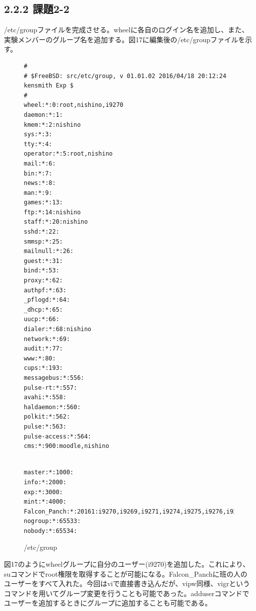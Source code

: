 \documentclass[12pt]{jreport}
\begin{document}
            \subsection*{2.2.2 課題2-2}
                /etc/groupファイルを完成させる。wheelに各自のログイン名を追加し、また、実験メンバーのグループ名を追加する。図17に編集後の/etc/groupファイルを示す。
                \begin{figure}[H]
                    \begin{center}
                        \begin{screen}
                            \begin{verbatim}
#
# $FreeBSD: src/etc/group, v 01.01.02 2016/04/18 20:12:24 kensmith Exp $
#
wheel:*:0:root,nishino,i9270
daemon:*:1:
kmem:*:2:nishino
sys:*:3:
tty:*:4:
operator:*:5:root,nishino
mail:*:6:
bin:*:7:
news:*:8:
man:*:9:
games:*:13:
ftp:*:14:nishino
staff:*:20:nishino
sshd:*:22:
smmsp:*:25:
mailnull:*:26:
guest:*:31:
bind:*:53:
proxy:*:62:
authpf:*:63:
_pflogd:*:64:
_dhcp:*:65:
uucp:*:66:
dialer:*:68:nishino
network:*:69:
audit:*:77:
www:*:80:
cups:*:193:
messagebus:*:556:
pulse-rt:*:557:
avahi:*:558:
haldaemon:*:560:
polkit:*:562:
pulse:*:563:
pulse-access:*:564:
cms:*:900:moodle,nishino
                            \end{verbatim}
                        \end{screen}
                    \end{center}
                \end{figure}
                \begin{figure}[H]
                    \begin{center}
                        \begin{screen}
                            \begin{verbatim}

master:*:1000:
info:*:2000:
exp:*:3000:
mint:*:4000:
Falcon_Panch:*:20161:i9270,i9269,i9271,i9274,i9275,i9276,i9277
nogroup:*:65533:
nobody:*:65534:
                            \end{verbatim}
                        \end{screen}
                        \caption{/etc/group}
                        \label{17}
                    \end{center}
                \end{figure}
                図17のようにwheelグループに自分のユーザー(i9270)を追加した。これにより、suコマンドでroot権限を取得することが可能になる。Falcon\_Panchに班の人のユーザーをすべて入れた。今回はviで直接書き込んだが、vipw同様、vigrというコマンドを用いてグループ変更を行うことも可能であった。adduserコマンドでユーザーを追加するときにグループに追加することも可能である。
\end{document}
